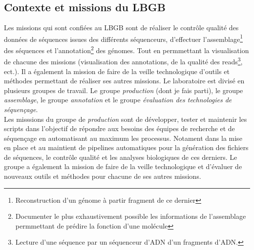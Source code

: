 \subsection{Contexte et missions du LBGB}
Les missions qui sont confiées au LBGB sont de réaliser le contrôle qualité des données de séquences issues des différents séquenceurs, d'effectuer l'assemblage\footnote{Reconstruction d'un génome à partir fragment de ce dernier} des séquences et l'annotation\footnote{Documenter le plus exhaustivement possible les informations de l'assemblage permmettant de prédire la fonction d'une molécule} des génomes. Tout en permmettant la visualisation de chacune des missions (visualisation des annotations, de la qualité des reads\footnote{Lecture d'une séquence par un séquenceur d'ADN d'un fragments d'ADN.}, ect.). Il a également la mission de faire de la veille technologique d'outils et méthodes permettant de réaliser ses autres missions. 
Le laboratoire est divisé en plusieurs groupes de travail. Le groupe \emph{production} (dont je fais parti), le groupe \emph{assemblage}, le groupe \emph{annotation} et le groupe \emph{évaluation des technologies de séquençage}.\\

Les misssions du groupe de \emph{production} sont de développer, tester et maintenir les scripts dans l'objectif de répondre aux besoins des équipes de recherche et de séquençage en automatisant au maximum les processus. Notament dans la mise en place et au maintient de pipelines automatiques pour la génération des fichiers de séquences, le contrôle qualité et les analyses biologiques de ces derniers. Le groupe a également la mission de faire de la veille technologique et d'évaluer de nouveaux outils et méthodes pour chacune de ses autres missions.


